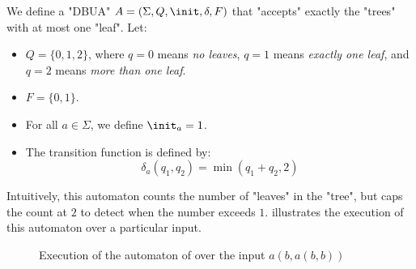 \documentclass[a4paper,UKenglish,cleveref, autoref, thm-restate]{lipics-v2021}
\begin{document}
\begin{example}\label{ex:count-leaves}
	We define a "DBUA" $A = (\Sigma, Q, \init, \delta, F)$ that "accepts" exactly the "trees" with at most one "leaf". Let:
	\begin{itemize}
		\item $Q = \{0,1,2\}$, where $q=0$ means \textit{no leaves}, $q=1$ means \textit{exactly one leaf},
		      and $q=2$ means \textit{more than one leaf}.
		\item $F = \{0,1\}$.
		\item For all $a \in \Sigma$, we define $\init_a = 1$.
		\item The transition function is defined by:
		      \[
			      \delta_a(q_1, q_2) = \min(q_1 + q_2, 2)
		      \]
	\end{itemize}

	Intuitively, this automaton counts the number of "leaves" in the "tree", but caps the count at $2$ to detect when the number exceeds $1$.
	 illustrates the execution of this automaton over a particular input.
\end{example}


\begin{figure}[h]\label{fig:count-leaves}
	\centering
	\caption{Execution of the automaton of  over the input $a(b,a(b,b))$}
\end{figure}
\end{document}
